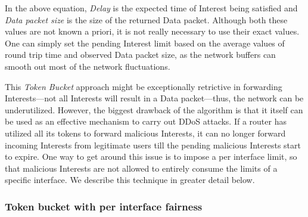 In the above equation, \emph{Delay} is the expected time of Interest being satisfied and \emph{Data packet size} is the size of the returned Data packet.
Although both these values are not known a priori, it is not really necessary to use their exact values.
One can simply set the pending Interest limit based on the average values of round trip time and observed Data packet size, as the network buffers can smooth out most of the network fluctuations.

This {\it Token Bucket} approach might be exceptionally retrictive in forwarding Interests---not all Interests will result in a Data packet---thus, the network can be underutilized. However, the biggest drawback of the algorithm is that it itself can be used as an effective mechanism to carry out DDoS attacks. If a router has utilized all its tokens to forward malicious Interests, it can no longer forward incoming Interests from legitimate users till the pending malicious Interests start to expire. One way to get around this issue is to impose a per interface limit, so that malicious Interests are not allowed to entirely consume the limits of a specific interface. We describe this technique in greater detail below.

%
%
%


\subsubsection{\textbf{Token bucket with per interface fairness}}
\label{sec:queuing}

